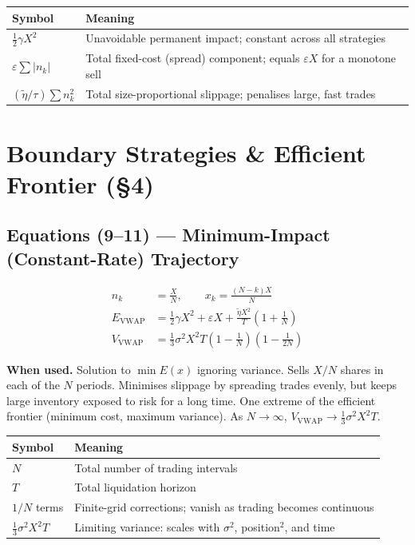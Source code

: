 \documentclass[11pt,a4paper]{article}
\begin{document}
\begin{center}
\begin{tabular}{@{}L{3.5cm}L{10cm}@{}}
\toprule
\textbf{Symbol} & \textbf{Meaning} \\
\midrule
$\tfrac{1}{2}\gamma X^2$ & Unavoidable permanent impact; constant across all strategies \\
$\varepsilon\sum|n_k|$ & Total fixed-cost (spread) component; equals $\varepsilon X$ for a monotone sell \\
$(\tilde{\eta}/\tau)\sum n_k^2$ & Total size-proportional slippage; penalises large, fast trades \\
\bottomrule
\end{tabular}
\end{center}

\section{Boundary Strategies \& Efficient Frontier (\texorpdfstring{\S}{§}4)}

\subsection*{Equations (9--11) — Minimum-Impact (Constant-Rate) Trajectory}

\begin{align}
  n_k &= \frac{X}{N}, \qquad x_k = \frac{(N-k)X}{N} \\[4pt]
  E_{\mathrm{VWAP}} &= \tfrac{1}{2}\gamma X^2 + \varepsilon X
                      + \frac{\tilde{\eta} X^2}{T}\!\left(1+\frac{1}{N}\right) \\[4pt]
  V_{\mathrm{VWAP}} &= \tfrac{1}{3}\sigma^2 X^2 T
                      \!\left(1-\frac{1}{N}\right)\!\left(1-\frac{1}{2N}\right)
\end{align}

\textbf{When used.} Solution to $\min E(x)$ ignoring variance.  Sells $X/N$ shares in
each of the $N$ periods.  Minimises slippage by spreading trades evenly, but keeps large
inventory exposed to risk for a long time.  One extreme of the efficient frontier (minimum
cost, maximum variance).  As $N\to\infty$, $V_{\mathrm{VWAP}}\to\tfrac{1}{3}\sigma^2X^2T$.

\begin{center}
\begin{tabular}{@{}L{3.5cm}L{10cm}@{}}
\toprule
\textbf{Symbol} & \textbf{Meaning} \\
\midrule
$N$ & Total number of trading intervals \\
$T$ & Total liquidation horizon \\
$1/N$ terms & Finite-grid corrections; vanish as trading becomes continuous \\
$\tfrac{1}{3}\sigma^2X^2T$ & Limiting variance: scales with $\sigma^2$, position$^2$, and time \\
\bottomrule
\end{tabular}
\end{center}
\end{document}

